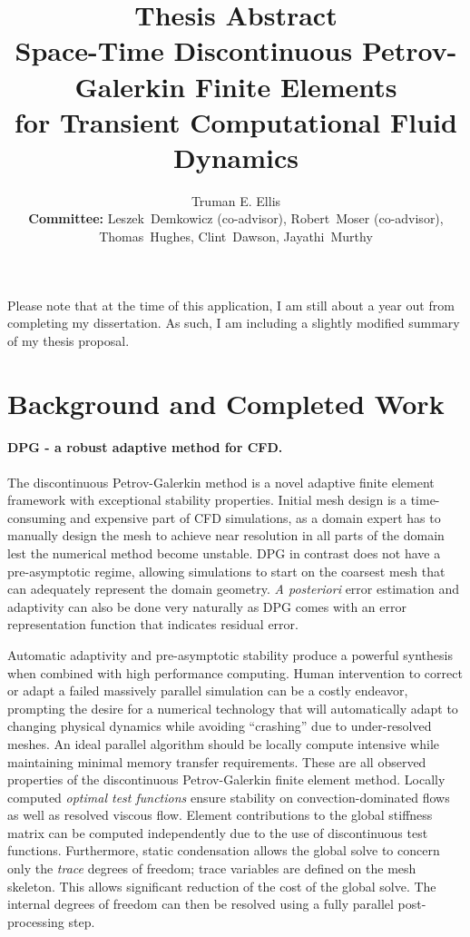 \documentclass[letterpaper]{article}
\title{Thesis Abstract \\ \vspace{2 mm} {\large Space-Time Discontinuous Petrov-Galerkin Finite Elements \\for Transient Computational Fluid Dynamics}}
\author{Truman E. Ellis\\
\small \textbf{Committee:} Leszek~Demkowicz (co-advisor), Robert~Moser (co-advisor), \\Thomas~Hughes, Clint~Dawson, Jayathi~Murthy}
\date{}
\begin{document}
\maketitle
Please note that at the time of this application, I am still about a year out from completing my dissertation. As such, I am including a slightly modified summary of my thesis proposal.

\section*{Background and Completed Work}
\paragraph{DPG - a robust adaptive method for CFD.}
The discontinuous Petrov-Galerkin method\cite{DPGOverview} is a novel adaptive finite element framework with exceptional stability properties.
Initial mesh design is a time-consuming and expensive part of CFD simulations, as a domain expert has to manually design the 
mesh to achieve near resolution in all parts of the domain lest the numerical method become unstable.
DPG in contrast does not have a pre-asymptotic regime, allowing simulations to start on the coarsest mesh that can adequately represent the domain geometry.
\emph{A posteriori} error estimation and adaptivity can also be done very naturally as DPG comes with an error representation function 
that indicates residual error.

Automatic adaptivity and pre-asymptotic stability produce a powerful synthesis when combined with high performance computing.
Human intervention to correct or adapt a failed massively parallel simulation can be a costly endeavor, prompting the desire for a
numerical technology that will automatically adapt to changing physical dynamics while avoiding ``crashing'' due to under-resolved meshes.
An ideal parallel algorithm should be locally compute intensive while maintaining minimal memory transfer requirements\cite{BlastWebPage}.
These are all observed properties of the discontinuous Petrov-Galerkin finite element method.
Locally computed \emph{optimal test functions} ensure stability on convection-dominated flows as well as resolved viscous flow.
Element contributions to the global stiffness matrix can be computed independently due to the use of discontinuous test functions.
Furthermore, static condensation allows the global solve to concern only the \emph{trace} degrees of freedom; 
trace variables are defined on the mesh skeleton.  
This allows significant reduction of the cost of the global solve.  
The internal degrees of freedom can then be resolved using a fully parallel post-processing step.
\end{document}
